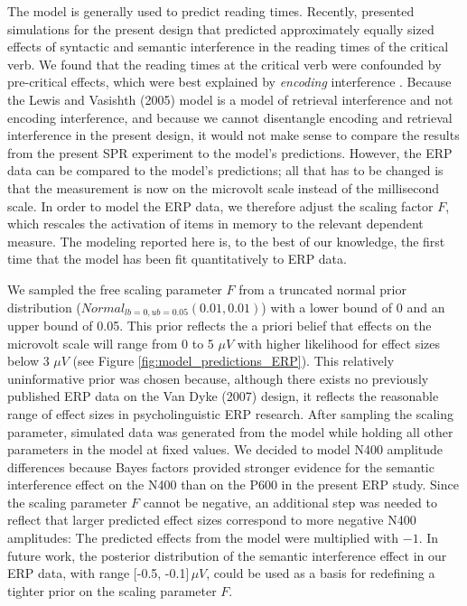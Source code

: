 \documentclass[review,preprint,12pt,authoryear,floatsintext]{elsarticle}
\begin{document}
\label{modeling}{The \citet{Lewis2005} model is generally used to predict reading times. Recently, \cite{mertzen} presented simulations for the present design that predicted approximately equally sized effects of syntactic and semantic interference in the reading times of the critical verb. We found that the reading times at the critical verb were confounded by pre-critical effects, which were best explained by \textit{encoding} interference \citep[see also][]{mertzen}. Because the Lewis and Vasishth (2005) model is a model of retrieval interference and not encoding interference, and because we cannot disentangle encoding and retrieval interference in the present design, it would not make sense to compare the results from the present SPR experiment to the model's predictions. However, the ERP data can be compared to the model's predictions; all that has to be changed is that the measurement is now on the microvolt scale instead of the millisecond scale. In order to model the ERP data, we therefore adjust the scaling factor $F$, which rescales the activation of items in memory to the relevant dependent measure. The modeling reported here is, to the best of our knowledge, the first time that the \citet{Lewis2005} model has been fit quantitatively to ERP data.

We sampled the free scaling parameter $F$ from a truncated normal prior distribution ($Normal_{lb=0,ub=0.05}(0.01, 0.01)$) with a lower bound of 0 and an upper bound of 0.05. This prior reflects the a priori belief that effects on the microvolt scale will range from 0 to 5 $\mu V$ with higher likelihood for effect sizes below 3 $\mu V$ (see Figure \ref{fig:model_predictions_ERP}). This relatively uninformative prior was chosen because, although there exists no previously published ERP data on the Van Dyke (2007) design, it reflects the reasonable range of effect sizes in psycholinguistic ERP research. After sampling the scaling parameter, simulated data was generated from the model while holding all other parameters in the model at fixed values. We decided to model N400 amplitude differences because Bayes factors provided stronger evidence for the semantic interference effect on the N400 than on the P600 in the present ERP study. Since the scaling parameter $F$ cannot be negative, an additional step was needed to reflect that larger predicted effect sizes correspond to more negative N400 amplitudes: The predicted effects from the model were multiplied with $-1$. In future work, the posterior distribution of the semantic interference effect in our ERP data, with range [-0.5, -0.1]\,$\mu V$, could be used as a basis for redefining a tighter prior on the scaling parameter $F$.

}
\end{document}
